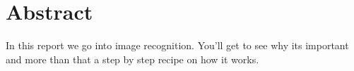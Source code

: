 \chapter*{Abstract}
In this report we go into image recognition. You'll get to see why its important and more than that a step by step recipe on how it works.